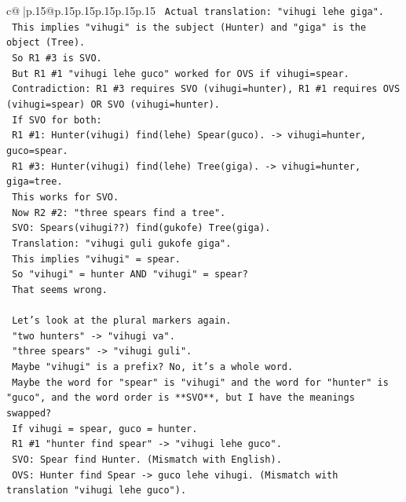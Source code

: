 \documentclass{article}
\begin{document}
{\begin{supertabular}{c@{$\;$}|p{.15\linewidth}@{}p{.15\linewidth}p{.15\linewidth}p{.15\linewidth}p{.15\linewidth}p{.15\linewidth}}
{{{\texttt{   Actual translation: "vihugi lehe giga".} \\
\texttt{   This implies "vihugi" is the subject (Hunter) and "giga" is the object (Tree).} \\
\texttt{   So R1 \#3 is SVO.} \\
\texttt{   But R1 \#1 "vihugi lehe guco" worked for OVS if vihugi=spear.} \\
\texttt{   Contradiction: R1 \#3 requires SVO (vihugi=hunter), R1 \#1 requires OVS (vihugi=spear) OR SVO (vihugi=hunter).} \\
\texttt{   If SVO for both:} \\
\texttt{   R1 \#1: Hunter(vihugi) find(lehe) Spear(guco). {-}> vihugi=hunter, guco=spear.} \\
\texttt{   R1 \#3: Hunter(vihugi) find(lehe) Tree(giga). {-}> vihugi=hunter, giga=tree.} \\
\texttt{   This works for SVO.} \\
\texttt{   Now R2 \#2: "three spears find a tree".} \\
\texttt{   SVO: Spears(vihugi??) find(gukofe) Tree(giga).} \\
\texttt{   Translation: "vihugi guli gukofe giga".} \\
\texttt{   This implies "vihugi" = spear.} \\
\texttt{   So "vihugi" = hunter AND "vihugi" = spear?} \\
\texttt{   That seems wrong.} \\
\\ 
\texttt{   Let's look at the plural markers again.} \\
\texttt{   "two hunters" {-}> "vihugi va".} \\
\texttt{   "three spears" {-}> "vihugi guli".} \\
\texttt{   Maybe "vihugi" is a prefix? No, it's a whole word.} \\
\texttt{   Maybe the word for "spear" is "vihugi" and the word for "hunter" is "guco", and the word order is **SVO**, but I have the meanings swapped?} \\
\texttt{   If vihugi = spear, guco = hunter.} \\
\texttt{   R1 \#1 "hunter find spear" {-}> "vihugi lehe guco".} \\
\texttt{   SVO: Spear find Hunter. (Mismatch with English).} \\
\texttt{   OVS: Hunter find Spear {-}> guco lehe vihugi. (Mismatch with translation "vihugi lehe guco").} \\
}}}
\end{supertabular}}
\end{document}
